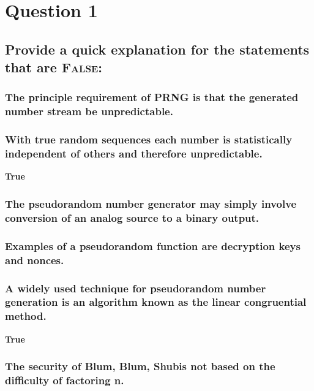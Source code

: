 \documentclass{report}
\begin{document}
	\section{Question 1}
	\startsection
		\renewcommand{\thesubsection}{\thesection.\Alph{subsection}}
		\subsection{Provide a quick explanation for the statements that are \textsc{False}:}
		\startsubsection
			\subsubsection{The principle requirement of PRNG is that the generated number stream be unpredictable.}
			\startsubsection
			\closesection
			\subsubsection{With true random sequences each number is statistically independent of others and therefore unpredictable.}
			\startsubsection
				\textbf{True}
			\closesection
			\subsubsection{The pseudorandom number generator may simply involve conversion of an analog source to a binary output.}
			\startsubsection
			\closesection
			\subsubsection{Examples of a pseudorandom function are decryption keys and nonces.}
			\startsubsection
			\closesection
			\subsubsection{A widely used technique for pseudorandom number generation is an algorithm known as the linear congruential method.}
			\startsubsection
				\textbf{True}
			\closesection
			\subsubsection{The security of Blum, Blum, Shubis not based on the difficulty of factoring n.}
			\startsubsection
			\closesection
		\closesection
	\closesection
\end{document}

